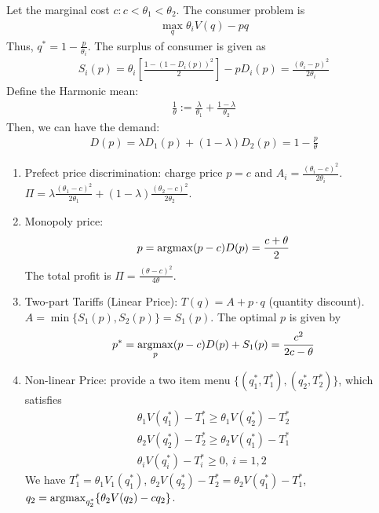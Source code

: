 \documentclass[11pt]{elegantbook}
\newcommand{\argmax}{\operatornamewithlimits{argmax}}
\begin{document}
Let the marginal cost $c:c<\theta_1<\theta_2$. The consumer problem is
\begin{equation}
    \begin{aligned}
        \max_q \theta_i V(q)-pq
    \end{aligned}
    \nonumber
\end{equation}
Thus, $q^*=1-\frac{p}{\theta_i}$. The surplus of consumer is given as
\begin{equation}
    \begin{aligned}
        S_i(p)=\theta_i\left[\frac{1-(1-D_i(p))^2}{2}\right]-pD_i(p)=\frac{(\theta_i-p)^2}{2\theta_i}
    \end{aligned}
    \nonumber
\end{equation}
Define the Harmonic mean:
\begin{equation}
    \begin{aligned}
        \frac{1}{\theta}:=\frac{\lambda}{\theta_1}+\frac{1-\lambda}{\theta_2}
    \end{aligned}
    \nonumber
\end{equation}
Then, we can have the demand:
\begin{equation}
    \begin{aligned}
        D(p)=\lambda D_1(p)+\left(1-\lambda\right)D_2(p)=1-\frac{p}{\theta}
    \end{aligned}
    \nonumber
\end{equation}
\begin{enumerate}
    \item Prefect price discrimination: charge price $p=c$ and $A_i=\frac{(\theta_i-c)^2}{2\theta_i}$. $\Pi=\lambda \frac{(\theta_1-c)^2}{2\theta_1}+\left(1-\lambda\right)\frac{(\theta_2-c)^2}{2\theta_2}$.
    \item Monopoly price: $$p=\argmax (p-c)D(p)=\frac{c+\theta}{2}$$
    The total profit is $\Pi=\frac{(\theta-c)^2}{4\theta}$.
    \item Two-part Tariffs (Linear Price): $T(q)=A+p\cdot q$ (quantity discount). $A=\min\{S_1(p),S_2(p)\}=S_1(p)$. The optimal $p$ is given by
    \begin{equation}
        \begin{aligned}
            p^*=\argmax_{p} (p-c)D(p)+S_1(p)=\frac{c^2}{2c-\theta}
        \end{aligned}
        \nonumber
    \end{equation}
    \item Non-linear Price: provide a two item menu $\{(q_1^*,T_1^*),(q_2^*,T_2^*)\}$, which satisfies
    \begin{equation}
        \begin{aligned}
            \theta_1 V(q_1^*)-T_1^*\geq\theta_1 V(q_2^*)-T_2^*\\
            \theta_2 V(q_2^*)-T_2^*\geq\theta_2 V(q_1^*)-T_1^*\\
            \theta_i V(q_i^*)-T_i^*\geq 0,\ i=1,2
        \end{aligned}
        \nonumber
    \end{equation}
    We have $T_1^*=\theta_1 V_1(q_1^*)$, $\theta_2 V(q_2^*)-T_2^*=\theta_2 V(q_1^*)-T_1^*$, $q_2=\argmax_{q_2^*}\{\theta_2 V(q_2)-c q_2\}$.
\end{enumerate}
\end{document}
